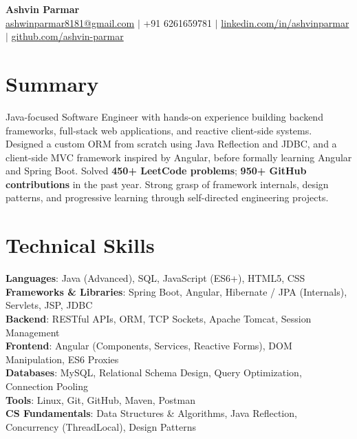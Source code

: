 \documentclass[a4paper,10pt]{article}
\begin{document}
\begin{center}
    {\LARGE \textbf{Ashvin Parmar}}\\
    \vspace{1mm}
    \href{mailto:ashwinparmar8181@gmail.com}{ashwinparmar8181@gmail.com} $|$
    +91 6261659781 $|$
    \href{https://www.linkedin.com/in/ashvinparmar/}{linkedin.com/in/ashvinparmar} $|$
    \href{https://github.com/ashvin-parmar}{github.com/ashvin-parmar}
\end{center}

\section*{Summary}
Java-focused Software Engineer with hands-on experience building backend frameworks, full-stack web applications, and reactive client-side systems. Designed a custom ORM from scratch using Java Reflection and JDBC, and a client-side MVC framework inspired by Angular, before formally learning Angular and Spring Boot. Solved \textbf{450+ LeetCode problems}; \textbf{950+ GitHub contributions} in the past year. Strong grasp of framework internals, design patterns, and progressive learning through self-directed engineering projects.

\section*{Technical Skills}
\textbf{Languages}: Java (Advanced), SQL, JavaScript (ES6+), HTML5, CSS \\
\textbf{Frameworks \& Libraries}: Spring Boot, Angular, Hibernate / JPA (Internals), Servlets, JSP, JDBC \\
\textbf{Backend}: RESTful APIs, ORM, TCP Sockets, Apache Tomcat, Session Management \\
\textbf{Frontend}: Angular (Components, Services, Reactive Forms), DOM Manipulation, ES6 Proxies \\
\textbf{Databases}: MySQL, Relational Schema Design, Query Optimization, Connection Pooling \\
\textbf{Tools}: Linux, Git, GitHub, Maven, Postman \\
\textbf{CS Fundamentals}: Data Structures \& Algorithms, Java Reflection, Concurrency (ThreadLocal), Design Patterns

\end{document}
